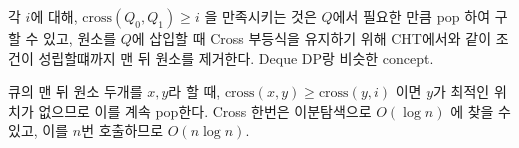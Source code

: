 각 $i$에 대해, $\text{cross}(Q_0, Q_1) \geq i$ 을 만족시키는 것은 $Q$에서 필요한 만큼 pop 하여 구할 수 있고, 원소를 $Q$에 삽입할 때 Cross 부등식을 유지하기 위해 CHT에서와 같이 조건이 성립할떄까지 맨 뒤 원소를 제거한다. Deque DP랑 비슷한 concept.

큐의 맨 뒤 원소 두개를 $x, y$라 할 때, $\text{cross}(x, y) \geq \text{cross}(y, i)$ 이면 $y$가 최적인 위치가 없으므로 이를 계속 pop한다. Cross 한번은 이분탐색으로 $O(\log n)$ 에 찾을 수 있고, 이를 $n$번 호출하므로 $O(n \log n)$.